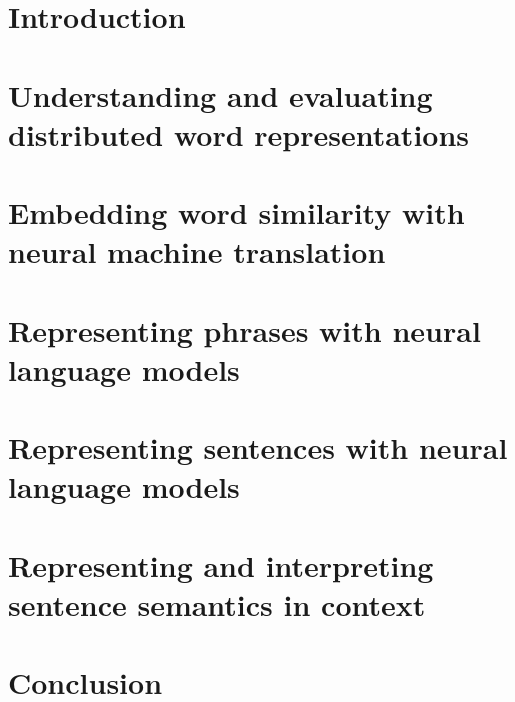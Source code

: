 \documentclass[withindex,glossary]{cam-thesis}
\begin{document}


\frontmatter{}



\chapter{Introduction}

\chapter{Understanding and evaluating distributed word representations}

\chapter{Embedding word similarity with neural machine translation}

\chapter{Representing phrases with neural language models}

\chapter{Representing sentences with neural language models}

\chapter{Representing and interpreting sentence semantics in context}

\chapter{Conclusion}



\cleardoublepage
{}
{}


\end{document}
